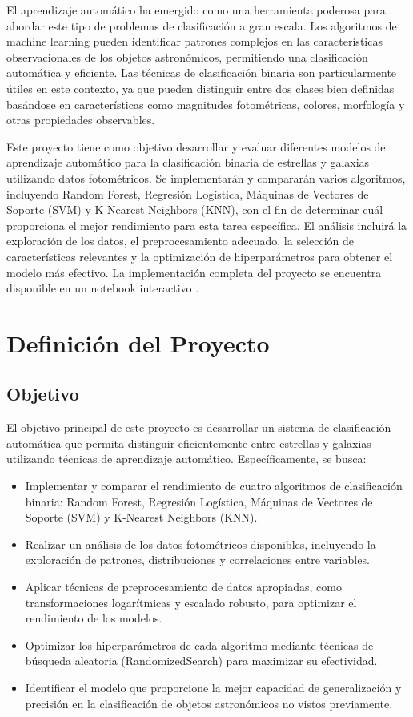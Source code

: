\documentclass{article}
\begin{document}
El aprendizaje automático ha emergido como una herramienta poderosa para abordar este tipo de problemas de clasificación a gran escala. Los algoritmos de machine learning pueden identificar patrones complejos en las características observacionales de los objetos astronómicos, permitiendo una clasificación automática y eficiente. Las técnicas de clasificación binaria son particularmente útiles en este contexto, ya que pueden distinguir entre dos clases bien definidas basándose en características como magnitudes fotométricas, colores, morfología y otras propiedades observables.

Este proyecto tiene como objetivo desarrollar y evaluar diferentes modelos de aprendizaje automático para la clasificación binaria de estrellas y galaxias utilizando datos fotométricos. Se implementarán y compararán varios algoritmos, incluyendo Random Forest, Regresión Logística, Máquinas de Vectores de Soporte (SVM) y K-Nearest Neighbors (KNN), con el fin de determinar cuál proporciona el mejor rendimiento para esta tarea específica. El análisis incluirá la exploración de los datos, el preprocesamiento adecuado, la selección de características relevantes y la optimización de hiperparámetros para obtener el modelo más efectivo. La implementación completa del proyecto se encuentra disponible en un notebook interactivo \cite{colab_notebook}.


\section{Definición del Proyecto}

\subsection{Objetivo}

El objetivo principal de este proyecto es desarrollar un sistema de clasificación automática que permita distinguir eficientemente entre estrellas y galaxias utilizando técnicas de aprendizaje automático. Específicamente, se busca:

\begin{itemize}
    \item Implementar y comparar el rendimiento de cuatro algoritmos de clasificación binaria: Random Forest, Regresión Logística, Máquinas de Vectores de Soporte (SVM) y K-Nearest Neighbors (KNN).
    \item Realizar un análisis de los datos fotométricos disponibles, incluyendo la exploración de patrones, distribuciones y correlaciones entre variables.
    \item Aplicar técnicas de preprocesamiento de datos apropiadas, como transformaciones logarítmicas y escalado robusto, para optimizar el rendimiento de los modelos.
    \item Optimizar los hiperparámetros de cada algoritmo mediante técnicas de búsqueda aleatoria (RandomizedSearch) para maximizar su efectividad.
    \item Identificar el modelo que proporcione la mejor capacidad de generalización y precisión en la clasificación de objetos astronómicos no vistos previamente.
\end{itemize}
\end{document}
